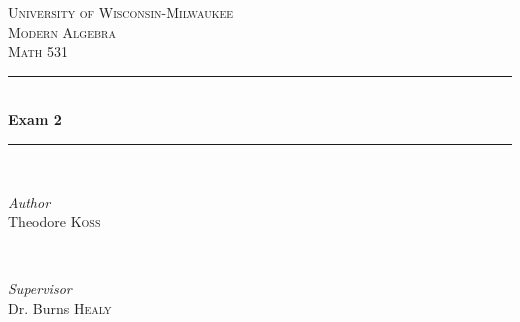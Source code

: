 \documentclass[hidelinks,12pt]{article}
\title{\scalebox{2}{Math 531 Exam 1}}
\author{\scalebox{1.5}{Theo Koss}}
\date{March 2021}
\begin{document}
\begin{titlepage} %
	\newcommand{\HRule}{\rule{\linewidth}{0.5mm}} %
	
	\center %
	
	
	\textsc{\LARGE University of Wisconsin-Milwaukee}\\[1.5cm] %
	
	\textsc{\Large Modern Algebra}\\[0.5cm] %
	
	\textsc{\large Math 531}\\[0.5cm] %
	
	
	\HRule\\[0.4cm]
	
	{\huge\bfseries Exam 2}\\[0.4cm] %
	
	\HRule\\[1.5cm]
	
	
	\begin{minipage}{0.4\textwidth}
		\begin{flushleft}
			\large
			\textit{Author}\\
			Theodore \textsc{Koss} %
		\end{flushleft}
	\end{minipage}
	~
	\begin{minipage}{0.4\textwidth}
		\begin{flushright}
			\large
			\textit{Supervisor}\\
			Dr. Burns \textsc{Healy} %
		\end{flushright}
	\end{minipage}
	
	

\end{titlepage}
\end{document}
